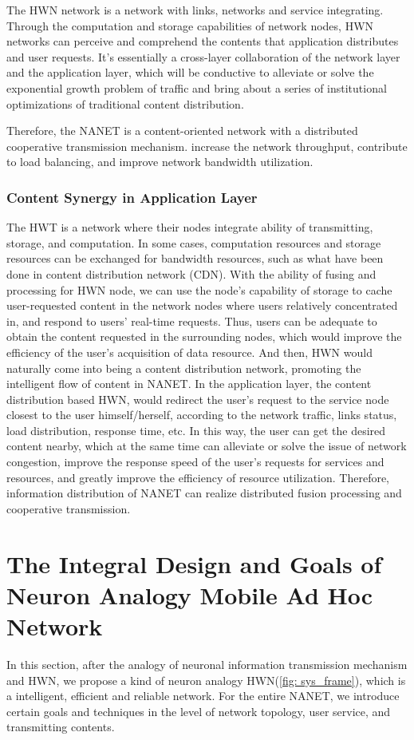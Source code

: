 \documentclass[journal,comsoc]{IEEEtran}
\begin{document}
				The HWN network is a network with links, networks and service integrating.
				Through the computation and storage capabilities of network nodes, HWN networks can perceive and comprehend the contents that application distributes and user requests.
				It's essentially a cross-layer collaboration of the network layer and the application layer, 
				which will be conductive to alleviate or solve the exponential growth problem of traffic and bring about a series of  institutional optimizations of traditional content distribution.
				
				Therefore, the NANET is a content-oriented network with a distributed cooperative transmission mechanism. increase the network throughput, 
				contribute to load balancing, and improve network bandwidth utilization.
				
			\subsubsection{Content Synergy in Application Layer}
				The HWT is a network where their nodes integrate ability of transmitting, storage, and computation.
				In some cases, computation resources and storage resources can be exchanged for bandwidth resources, such as what have been done in content distribution network (CDN). 
				With the ability of fusing and processing for HWN node, we can use the node's capability of storage to cache user-requested content in the network nodes where users relatively concentrated in, and respond to users' real-time requests. Thus, users can be adequate to obtain the content requested in the surrounding nodes, which would improve the efficiency of the user's acquisition of data resource.
				And then, HWN would naturally come into being a content distribution network, promoting the intelligent flow of content in NANET.
				In the application layer, the content distribution based HWN, would redirect the user's request to the service node closest to the user himself/herself, according to the network traffic, links status, load distribution, response time, etc.
				In this way, the user can get the desired content nearby, which at the same time can alleviate or solve the issue of network congestion, improve the response speed of the user's requests for services and resources, and greatly improve the efficiency of resource utilization.
				Therefore, information distribution of NANET can realize distributed fusion processing and cooperative transmission.
				
	
	\section{The Integral Design and Goals of Neuron Analogy Mobile Ad Hoc Network}
	\label{section: general_design}
		In this section, after the analogy of neuronal information transmission mechanism and HWN, 
		we propose a kind of neuron analogy HWN(\ref{fig: sys_frame}), which is a intelligent, efficient and reliable network.
		For the entire NANET, we introduce certain goals and techniques in the level of network topology, user service, and transmitting contents.
\end{document}
